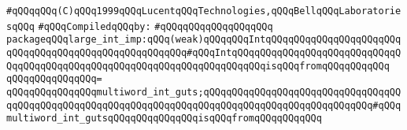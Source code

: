 \label{src/lib/std/src/bind-largeint-32.pkg}
\verb|#qQQqqQQq(C)qQQq1999qQQqLucentqQQqTechnologies,qQQqBellqQQqLaboratoriesqQQq|\newline
\newline
\verb|#qQQqCompiledqQQqby:|\newline
\verb|#qQQqqQQqqQQqqQQqqQQq|\newline
\newline
\verb|packageqQQqlarge_int_imp:qQQq(weak)qQQqqQQqIntqQQqqQQqqQQqqQQqqQQqqQQqqQQqqQQqqQQqqQQqqQQqqQQqqQQqqQQq#qQQqIntqQQqqQQqqQQqqQQqqQQqqQQqqQQqqQQqqQQqqQQqqQQqqQQqqQQqqQQqqQQqqQQqqQQqqQQqqQQqisqQQqfromqQQqqQQqqQQq|\newline
\verb|qQQqqQQqqQQqqQQq=|\newline
\verb|qQQqqQQqqQQqqQQqmultiword_int_guts;qQQqqQQqqQQqqQQqqQQqqQQqqQQqqQQqqQQqqQQqqQQqqQQqqQQqqQQqqQQqqQQqqQQqqQQqqQQqqQQqqQQqqQQqqQQqqQQqqQQq#qQQqmultiword_int_gutsqQQqqQQqqQQqqQQqisqQQqfromqQQqqQQqqQQq|\newline

